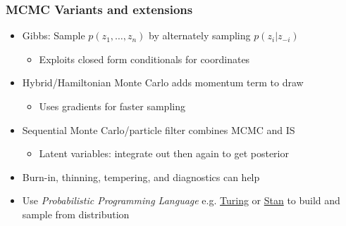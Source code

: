 \documentclass[bigger,handout]{beamer}
\begin{document}
\begin{frame}%

\frametitle{MCMC Variants and extensions}

\begin{itemize}

\item Gibbs: Sample $p(z_{1},\ldots,z_{n})$ by alternately sampling $p(z_{i}|z_{-i})$

\begin{itemize}
\item Exploits closed form conditionals for coordinates
\end{itemize}

\item Hybrid/Hamiltonian Monte Carlo adds momentum term to draw 
\begin{itemize}
\item Uses gradients for faster sampling
\end{itemize}

\item Sequential Monte Carlo/particle filter combines MCMC and IS

\begin{itemize}
\item Latent variables: integrate out then again to get posterior
\end{itemize}

\item Burn-in, thinning, tempering, and diagnostics can help 
\item Use \emph{Probabilistic Programming Language} e.g. \href{https://turing.ml/}{Turing} or \href{https://mc-stan.org/}{Stan} to build and sample from distribution

\end{itemize}


\end{frame}%
\end{document}
